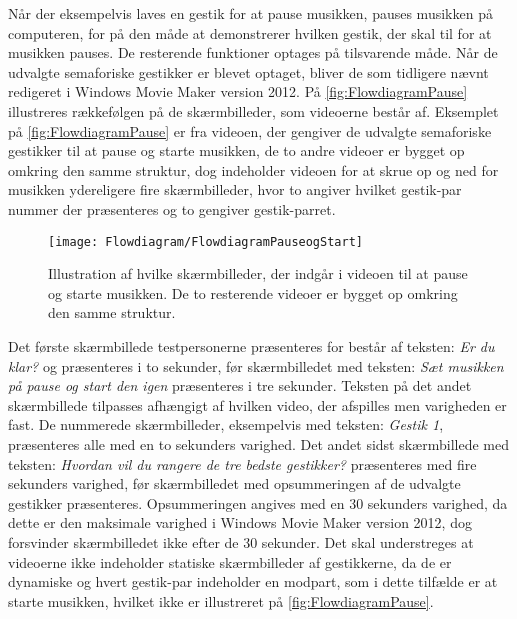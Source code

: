 Når der eksempelvis laves en gestik for at pause musikken, pauses musikken på computeren, for på den måde at demonstrerer hvilken gestik, der skal til for at musikken pauses. De resterende funktioner optages på tilsvarende måde.\blankline
%
Når de udvalgte semaforiske gestikker er blevet optaget, bliver de som tidligere nævnt redigeret i Windows Movie Maker version 2012. På \autoref{fig:FlowdiagramPause} illustreres rækkefølgen på de skærmbilleder, som videoerne består af. Eksemplet på \autoref{fig:FlowdiagramPause} er fra videoen, der gengiver de udvalgte semaforiske gestikker til at pause og starte musikken, de to andre videoer er bygget op omkring den samme struktur, dog indeholder videoen for at skrue op og ned for musikken ydereligere fire skærmbilleder, hvor to angiver hvilket gestik-par nummer der præsenteres og to gengiver gestik-parret.       
%
\begin{figure}[H]
	\centering
	\texttt{[image: Flowdiagram/FlowdiagramPauseogStart]}
	\caption{Illustration af hvilke skærmbilleder, der indgår i videoen til at pause og starte musikken. De to resterende videoer er bygget op omkring den samme struktur.}
	\label{fig:FlowdiagramPause}
\end{figure}
\noindent
%
Det første skærmbillede testpersonerne præsenteres for består af teksten: \textit{Er du klar?} og præsenteres i to sekunder, før skærmbilledet med teksten: \textit{Sæt musikken på pause og start den igen} præsenteres i tre sekunder. Teksten på det andet skærmbillede tilpasses afhængigt af hvilken video, der afspilles men varigheden er fast. De nummerede skærmbilleder, eksempelvis med teksten: \textit{Gestik 1}, præsenteres alle med en to sekunders varighed. Det andet sidst skærmbillede med teksten: \textit{Hvordan vil du rangere de tre bedste gestikker?} præsenteres med fire sekunders varighed, før skærmbilledet med opsummeringen af de udvalgte gestikker præsenteres. Opsummeringen angives med en 30 sekunders varighed, da dette er den maksimale varighed i Windows Movie Maker version 2012, dog forsvinder skærmbilledet ikke efter de 30 sekunder. Det skal understreges at videoerne ikke indeholder statiske skærmbilleder af gestikkerne, da de er dynamiske og hvert gestik-par indeholder en modpart, som i dette tilfælde er at starte musikken, hvilket ikke er illustreret på \autoref{fig:FlowdiagramPause}.

